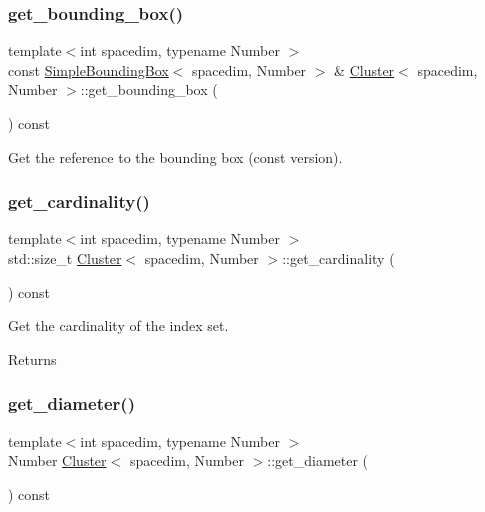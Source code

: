 \subsubsection{\texorpdfstring{get\+\_\+bounding\+\_\+box()}{get\_bounding\_box()}\hspace{0.1cm}{\footnotesize\ttfamily [2/2]}}
{\footnotesize\ttfamily template$<$int spacedim, typename Number $>$ \\
const \hyperlink{classSimpleBoundingBox}{Simple\+Bounding\+Box}$<$ spacedim, Number $>$ \& \hyperlink{classCluster}{Cluster}$<$ spacedim, Number $>$\+::get\+\_\+bounding\+\_\+box (\begin{DoxyParamCaption}{ }\end{DoxyParamCaption}) const}

Get the reference to the bounding box (const version). \mbox{\label{classCluster_a7fd600d238aa703f40407e609c08fec6}} 
\subsubsection{\texorpdfstring{get\+\_\+cardinality()}{get\_cardinality()}}
{\footnotesize\ttfamily template$<$int spacedim, typename Number $>$ \\
std\+::size\+\_\+t \hyperlink{classCluster}{Cluster}$<$ spacedim, Number $>$\+::get\+\_\+cardinality (\begin{DoxyParamCaption}{ }\end{DoxyParamCaption}) const}

Get the cardinality of the index set. \begin{DoxyReturn}{Returns}

\end{DoxyReturn}
\mbox{\label{classCluster_aab3f02640b57812eb697c39e8c4cc2e3}} 
\subsubsection{\texorpdfstring{get\+\_\+diameter()}{get\_diameter()}}
{\footnotesize\ttfamily template$<$int spacedim, typename Number $>$ \\
Number \hyperlink{classCluster}{Cluster}$<$ spacedim, Number $>$\+::get\+\_\+diameter (\begin{DoxyParamCaption}{ }\end{DoxyParamCaption}) const}

